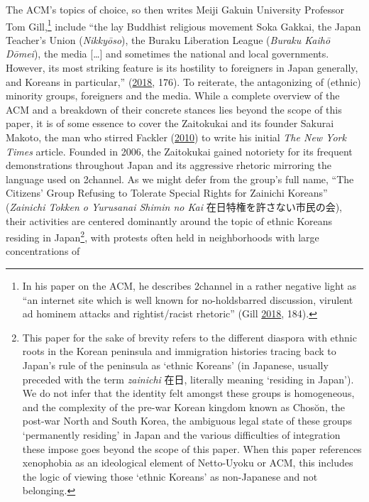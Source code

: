 \documentclass[10pt,british,A4paper,,openany]{memoir}
\begin{document}
The ACM's topics of choice, so then writes Meiji Gakuin University
Professor Tom Gill,\footnote{In his paper on the ACM, he describes
  2channel in a rather negative light as ``an internet site which is
  well known for no-holdsbarred discussion, virulent ad hominem attacks
  and rightist/racist rhetoric'' (Gill
  \protect\hyperlink{ref-gill_nativist_2018}{2018}, 184).} include ``the
lay Buddhist religious movement Soka Gakkai, the Japan Teacher's Union
(\emph{Nikkyōso}), the Buraku Liberation League (\emph{Buraku Kaihō
Dōmei}), the media {[}\ldots{}{]} and sometimes the national and local
governments. However, its most striking feature is its hostility to
foreigners in Japan generally, and Koreans in particular,''
(\protect\hyperlink{ref-gill_nativist_2018}{2018}, 176). To reiterate,
the antagonizing of (ethnic) minority groups, foreigners and the media.
While a complete overview of the ACM and a breakdown of their concrete
stances lies beyond the scope of this paper, it is of some essence to
cover the Zaitokukai and its founder Sakurai Makoto, the man who stirred
Fackler (\protect\hyperlink{ref-fackler_new_2010-1}{2010}) to write his
initial \emph{The New York Times} article. Founded in 2006, the
Zaitokukai gained notoriety for its frequent demonstrations throughout
Japan and its aggressive rhetoric mirroring the language used on
2channel. As we might defer from the group's full name, ``The Citizens'
Group Refusing to Tolerate Special Rights for Zainichi Koreans''
(\emph{Zainichi Tokken o Yurusanai Shimin no Kai}
在日特権を許さない市民の会), their activities are centered dominantly
around the topic of ethnic Koreans residing in Japan\footnote{This paper
  for the sake of brevity refers to the different diaspora with ethnic
  roots in the Korean peninsula and immigration histories tracing back
  to Japan's rule of the peninsula as `ethnic Koreans' (in Japanese,
  usually preceded with the term \emph{zainichi} 在日, literally meaning
  `residing in Japan'). We do not infer that the identity felt amongst
  these groups is homogeneous, and the complexity of the pre-war Korean
  kingdom known as Chosŏn, the post-war North and South Korea, the
  ambiguous legal state of these groups `permanently residing' in Japan
  and the various difficulties of integration these impose goes beyond
  the scope of this paper. When this paper references xenophobia as an
  ideological element of Netto-Uyoku or ACM, this includes the logic of
  viewing those `ethnic Koreans' as non-Japanese and not belonging.},
with protests often held in neighborhoods with large concentrations of
\end{document}
